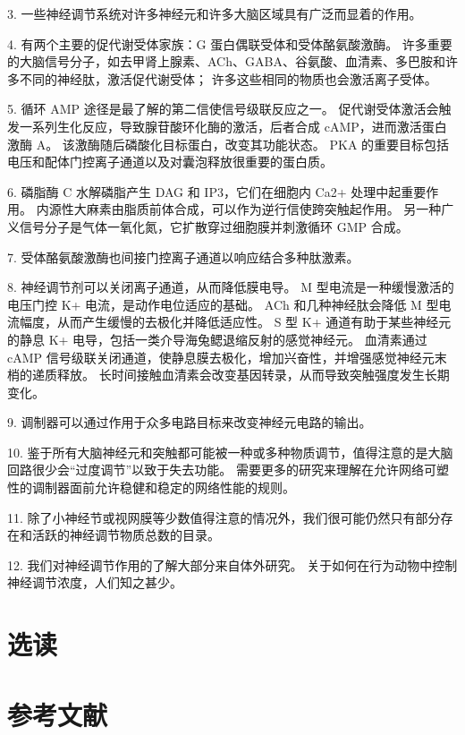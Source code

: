 3. 一些神经调节系统对许多神经元和许多大脑区域具有广泛而显着的作用。 


4. 有两个主要的促代谢受体家族：G 蛋白偶联受体和受体酪氨酸激酶。 
许多重要的大脑信号分子，如去甲肾上腺素、ACh、GABA、谷氨酸、血清素、多巴胺和许多不同的神经肽，激活促代谢受体； 许多这些相同的物质也会激活离子受体。 


5. 循环 AMP 途径是最了解的第二信使信号级联反应之一。 
促代谢受体激活会触发一系列生化反应，导致腺苷酸环化酶的激活，后者合成 cAMP，进而激活蛋白激酶 A。
该激酶随后磷酸化目标蛋白，改变其功能状态。 
PKA 的重要目标包括电压和配体门控离子通道以及对囊泡释放很重要的蛋白质。 


6. 磷脂酶 C 水解磷脂产生 DAG 和 IP3，它们在细胞内 Ca2+ 处理中起重要作用。 
内源性大麻素由脂质前体合成，可以作为逆行信使跨突触起作用。 
另一种广义信号分子是气体一氧化氮，它扩散穿过细胞膜并刺激循环 GMP 合成。 


7. 受体酪氨酸激酶也间接门控离子通道以响应结合多种肽激素。 


8. 神经调节剂可以关闭离子通道，从而降低膜电导。 
M 型电流是一种缓慢激活的电压门控 K+ 电流，是动作电位适应的基础。 
ACh 和几种神经肽会降低 M 型电流幅度，从而产生缓慢的去极化并降低适应性。 
S 型 K+ 通道有助于某些神经元的静息 K+ 电导，包括一类介导海兔鳃退缩反射的感觉神经元。 
血清素通过 cAMP 信号级联关闭通道，使静息膜去极化，增加兴奋性，并增强感觉神经元末梢的递质释放。 
长时间接触血清素会改变基因转录，从而导致突触强度发生长期变化。 


9. 调制器可以通过作用于众多电路目标来改变神经元电路的输出。 


10. 鉴于所有大脑神经元和突触都可能被一种或多种物质调节，值得注意的是大脑回路很少会“过度调节”以致于失去功能。 
需要更多的研究来理解在允许网络可塑性的调制器面前允许稳健和稳定的网络性能的规则。 


11. 除了小神经节或视网膜等少数值得注意的情况外，我们很可能仍然只有部分存在和活跃的神经调节物质总数的目录。 


12. 我们对神经调节作用的了解大部分来自体外研究。 关于如何在行为动物中控制神经调节浓度，人们知之甚少。


\section{选读}

\section{参考文献}


